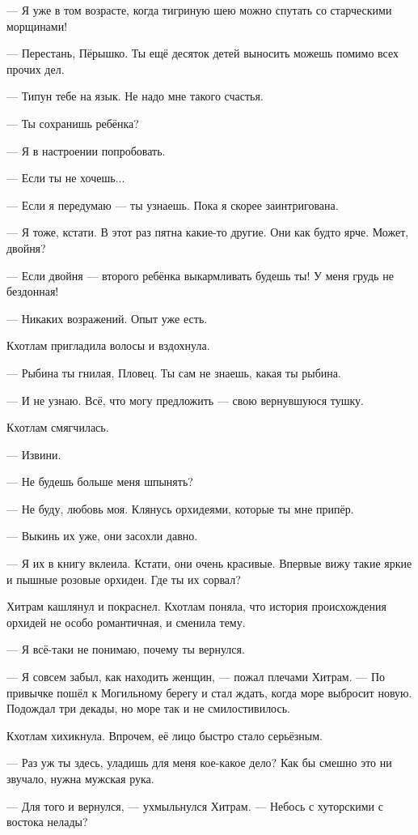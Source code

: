 --- Я уже в том возрасте, когда тигриную шею можно спутать со старческими морщинами!

--- Перестань, Пёрышко.
Ты ещё десяток детей выносить можешь помимо всех прочих дел.

--- Типун тебе на язык.
Не надо мне такого счастья.

--- Ты сохранишь ребёнка?

--- Я в настроении попробовать.

--- Если ты не хочешь...

--- Если я передумаю --- ты узнаешь.
Пока я скорее заинтригована.

--- Я тоже, кстати.
В этот раз пятна какие-то другие.
Они как будто ярче.
Может, двойня?

--- Если двойня --- второго ребёнка выкармливать будешь ты!
У меня грудь не бездонная!

--- Никаких возражений.
Опыт уже есть.

Кхотлам пригладила волосы и вздохнула.

--- Рыбина ты гнилая, Пловец.
Ты сам не знаешь, какая ты рыбина.

--- И не узнаю.
Всё, что могу предложить --- свою вернувшуюся тушку.

Кхотлам смягчилась.

--- Извини.

--- Не будешь больше меня шпынять?

--- Не буду, любовь моя.
Клянусь орхидеями, которые ты мне припёр.

--- Выкинь их уже, они засохли давно.

--- Я их в книгу вклеила.
Кстати, они очень красивые.
Впервые вижу такие яркие и пышные розовые орхидеи.
Где ты их сорвал?

Хитрам кашлянул и покраснел.
Кхотлам поняла, что история происхождения орхидей не особо романтичная, и сменила тему.

--- Я всё-таки не понимаю, почему ты вернулся.

--- Я совсем забыл, как находить женщин, --- пожал плечами Хитрам.
--- По привычке пошёл к Могильному берегу и стал ждать, когда море выбросит новую.
Подождал три декады, но море так и не смилостивилось.

Кхотлам хихикнула.
Впрочем, её лицо быстро стало серьёзным.

--- Раз уж ты здесь, уладишь для меня кое-какое дело?
Как бы смешно это ни звучало, нужна мужская рука.

--- Для того и вернулся, --- ухмыльнулся Хитрам.
--- Небось с хуторскими с востока нелады?

